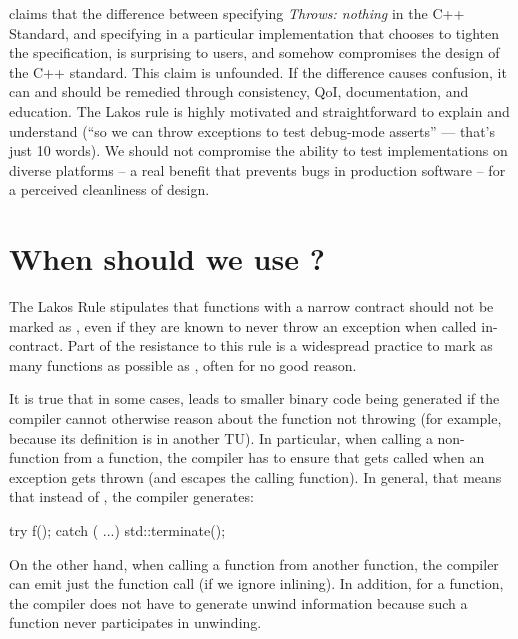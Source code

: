 \cite{P1656R2} claims that the difference between specifying \emph{Throws: nothing} in the C++ Standard, and specifying  in a particular implementation that chooses to tighten the specification, is surprising to users, and somehow compromises the design of the C++ standard. This claim is unfounded. If the difference causes confusion, it can and should be remedied through consistency, QoI, documentation, and education. The Lakos rule is highly motivated and straightforward to explain and understand (``so we can throw exceptions to test debug-mode asserts'' --- that's just 10 words). We should not compromise the ability to test implementations on diverse platforms -- a real benefit that prevents bugs in production software -- for a perceived cleanliness of design.

\section{When should we use ?}
\label{sec:noexcept}

The Lakos Rule stipulates that functions with a narrow contract should not be marked as , even if they are known to never throw an exception when called in-contract. Part of the resistance to this rule is a widespread practice to mark as many functions as possible as , often for no good reason.

It is true that in some cases,  leads to smaller binary code being generated if the compiler cannot otherwise reason about the function not throwing (for example, because its definition is in another TU). In particular, when calling a non- function  from a  function, the compiler has to ensure that  gets called when an exception gets thrown (and escapes the calling function). In general, that means that instead of , the compiler generates:
\begin{codeblock}
try { f(); } catch ( ...) { std::terminate(); }
\end{codeblock}
On the other hand, when calling a  function from another  function, the compiler can emit just the function call (if we ignore inlining). In addition, for a  function, the compiler does not have to generate unwind information because such a function never participates in unwinding.

